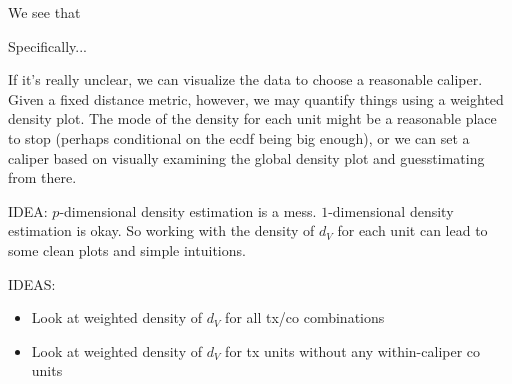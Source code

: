 \documentclass{article}
\begin{document}
We see that 


Specifically...

If it's really unclear, we can visualize the data to choose a reasonable caliper.
Given a fixed distance metric, however, we may quantify things using a weighted density plot.
The mode of the density for each unit might be a reasonable place to stop (perhaps conditional on the ecdf being big enough), or we can set a caliper based on visually examining the global density plot and guesstimating from there.

IDEA: $p$-dimensional density estimation is a mess.
$1$-dimensional density estimation is okay.
So working with the density of $d_V$ for each unit can lead to some clean plots and simple intuitions.

IDEAS:
\begin{itemize}
    \item Look at weighted density of $d_V$ for all tx/co combinations
    \item Look at weighted density of $d_V$ for tx units without any within-caliper co units
\end{itemize}



\end{document}
